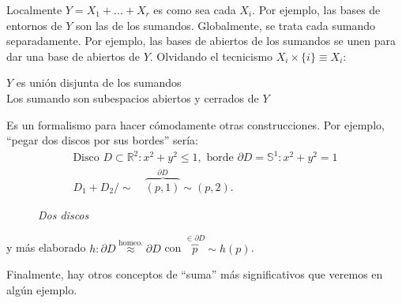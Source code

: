\begin{pg}
Localmente $Y = X_1 + \ldots + X_r$ es como sea cada $X_i$. Por ejemplo, las bases de entornos de $Y$ son las de los sumandos. Globalmente, se trata cada sumando separadamente. Por ejemplo, las bases de abiertos de los sumandos se unen para dar una base de abiertos de $Y$. Olvidando el tecnicismo $X_i \times \{i\} \equiv X_i$:
\begin{center}
   $Y$ es unión disjunta de los sumandos\\
   Los sumando son subespacios abiertos y cerrados de $Y$
\end{center}
Es un formalismo para hacer cómodamente otras construcciones. Por ejemplo, ``pegar dos discos por sus bordes'' sería:
\begin{gather*}
    \text{Disco } D \subset \mathbb{R}^2: x^2 + y^2 \le 1, \text{ borde } \partial D = \mathbb{S}^1: x^2 + y^2 = 1\\
    D_1 + D_2 / \sim\quad \overbrace{\left( p, 1 \right)}^{\partial D} \sim \left( p, 2 \right) 
.\end{gather*}

\begin{figure}[H]
    \centering
    \caption{\textit{Dos discos}}
    \label{fig:dos-discos.}
\end{figure}
y más elaborado $h: \partial D \stackrel{\text{homeo.}}{\approx} \partial D$ con $\overbrace{p}^{\in \partial D} \sim h\left( p \right)$.

Finalmente, hay otros conceptos de ``suma'' más significativos que veremos en algún ejemplo.
\end{pg}



